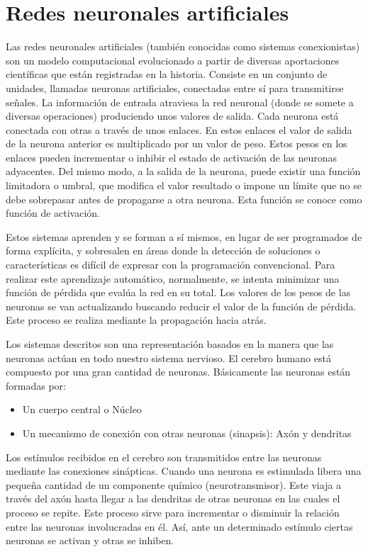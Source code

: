 \newpage

\section{Redes neuronales artificiales}
Las redes neuronales artificiales (también conocidas como sistemas conexionistas) son un modelo computacional evolucionado a partir de diversas aportaciones científicas que están registradas en la historia.  
Consiste en un conjunto de unidades, llamadas neuronas artificiales, conectadas entre sí para transmitirse señales. La información de entrada atraviesa la red neuronal (donde se somete a diversas operaciones) produciendo unos valores de salida.
Cada neurona está conectada con otras a través de unos enlaces. En estos enlaces el valor de salida de la neurona anterior es multiplicado por un valor de peso. Estos pesos en los enlaces pueden incrementar o inhibir el estado de activación de las neuronas adyacentes. Del mismo modo, a la salida de la neurona, puede existir una función limitadora o umbral, que modifica el valor resultado o impone un límite que no se debe sobrepasar antes de propagarse a otra neurona. Esta función se conoce como función de activación.

Estos sistemas aprenden y se forman a sí mismos, en lugar de ser programados de forma explícita, y sobresalen en áreas donde la detección de soluciones o características es difícil de expresar con la programación convencional. Para realizar este aprendizaje automático, normalmente, se intenta minimizar una función de pérdida que evalúa la red en su total. Los valores de los pesos de las neuronas se van actualizando buscando reducir el valor de la función de pérdida. Este proceso se realiza mediante la propagación hacia atrás.

Los sistemas descritos son una representación basados en la manera que las neuronas actúan en todo nuestro sistema nervioso. El cerebro humano está compuesto por una gran cantidad de neuronas.
Básicamente las neuronas están formadas por: 
\begin{itemize}
    \item Un cuerpo central o Núcleo
    \item Un mecanismo de conexión con otras neuronas (sinapsis): Axón y dendritas
\end{itemize}

Los estímulos recibidos en el cerebro son transmitidos entre las neuronas mediante las conexiones sinápticas. Cuando una neurona es estimulada libera una pequeña cantidad de un componente químico (neurotransmisor). Este viaja a través del axón hasta llegar a las dendritas de otras neuronas en las cuales el proceso se repite. Este proceso sirve para incrementar o disminuir la relación entre las neuronas involucradas en él. Así, ante un determinado estímulo ciertas neuronas se activan y otras se inhiben.

